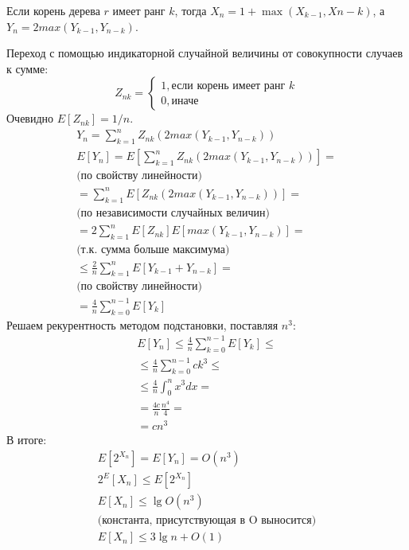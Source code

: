 \documentclass[11pt]{article}
\begin{document}
Если корень дерева $r$ имеет ранг $k$, тогда $X_n = 1 + \max(X_{k-1}, X{n-k})$, а $Y_n = 2max(Y_{k-1}, Y_{n-k})$.

Переход с помощью индикаторной случайной величины от совокупности случаев к сумме:
\begin{equation*}
  Z_{nk} = \begin{cases}
      1, \text{если корень имеет ранг } k\\
      0, \text{иначе}
  \end{cases}
\end{equation*}
Очевидно $E[Z_{nk}] = 1 / n$.
\begin{align*}
  Y_n = \sum_{k=1}^{n} Z_{nk} (2max(Y_{k-1}, Y_{n-k})) \\
  E[Y_n] = E[\sum_{k=1}^{n} Z_{nk} (2max(Y_{k-1}, Y_{n-k})) ] = \\
  \text{(по свойству линейности)} \\
  = \sum_{k=1}^{n} E[Z_{nk} (2max(Y_{k-1}, Y_{n-k}))] = \\
  \text{(по независимости случайных величин)} \\
  = 2 \sum_{k=1}^{n} E[Z_{nk}] E[max(Y_{k-1}, Y_{n-k})] = \\
  \text{(т.к. сумма больше максимума)} \\
  \leqslant \frac{2}{n} \sum_{k=1}^{n} E[Y_{k-1} + Y_{n-k}] = \\
  \text{(по свойству линейности)} \\
  = \frac{4}{n}\sum_{k=0}^{n-1}E[Y_k]
\end{align*}
Решаем рекурентность методом подстановки, поставляя $n^3$:
\begin{align*}
  E[Y_n] \leqslant \frac{4}{n}\sum_{k=0}^{n-1}E[Y_k] \leqslant \\
  \leqslant \frac{4}{n}\sum_{k=0}^{n-1}c k^3 \leqslant \\
  \leqslant \frac{4}{n}\int_{0}^{n}x^3 dx = \\
  = \frac{4c}{n} \frac{n^4}{4} = \\
  = c n^3
\end{align*}
В итоге:
\begin{align*}
  E[2^{X_n}] = E[Y_n] = O(n^3) \\
  2^E[X_n] \leqslant E[2^{X_n}] \\
  E[X_n] \leqslant \lg O(n^3) \\
  \text{(константа, присутствующая в O выносится)} \\
  E[X_n] \leqslant 3 \lg n + O(1) \\
\end{align*}
\end{document}
